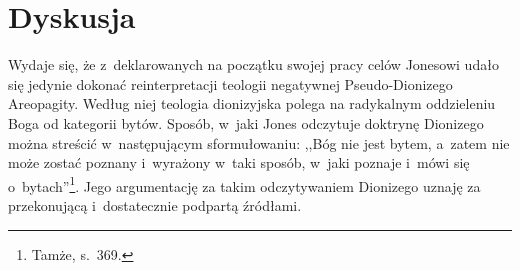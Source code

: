 \section{Dyskusja}

Wydaje się, że z~deklarowanych na początku swojej pracy celów Jonesowi udało się jedynie dokonać reinterpretacji teologii negatywnej Pseudo-Dionizego Areopagity. Według niej teologia dionizyjska polega na radykalnym oddzieleniu Boga od kategorii bytów. Sposób, w~jaki Jones odczytuje doktrynę Dionizego można streścić w~następującym sformułowaniu: ,,Bóg nie jest bytem, a~zatem nie może zostać poznany i~wyrażony w~taki sposób, w~jaki poznaje i~mówi się o~bytach''\footnote{Tamże, s.~369.}. Jego argumentację za takim odczytywaniem Dionizego uznaję za przekonującą i~dostatecznie podpartą źródłami.

